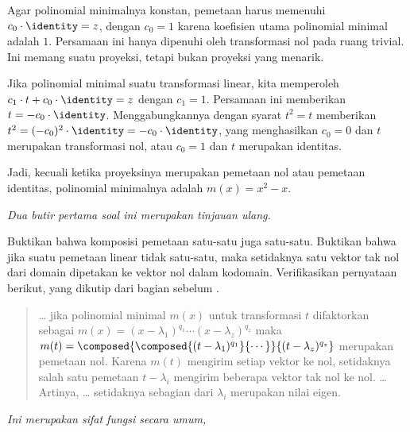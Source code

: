 \begin{exercises}
\begin{answer}
      Agar polinomial minimalnya konstan, pemetaan harus memenuhi
      $c_0\cdot\identity=z$, dengan $c_0=1$ karena koefisien utama
      polinomial minimal adalah $1$.
      Persamaan ini hanya dipenuhi oleh transformasi nol pada ruang trivial.
      Ini memang suatu proyeksi, tetapi bukan proyeksi yang menarik.

      Jika polinomial minimal suatu transformasi linear, kita memperoleh
      $c_1\cdot t+c_0\cdot\identity=z$ dengan $c_1=1$.
      Persamaan ini memberikan $t=-c_0\cdot \identity$.
      Menggabungkannya dengan syarat $t^2=t$ memberikan
      $t^2=(-c_0)^2\cdot\identity=-c_0\cdot\identity$, yang menghasilkan
      $c_0=0$ dan $t$ merupakan transformasi nol, atau $c_0=1$ dan
      $t$ merupakan identitas.

      Jadi, kecuali ketika proyeksinya merupakan pemetaan nol atau
      pemetaan identitas, polinomial minimalnya adalah $m(x)=x^2-x$.
    \end{answer}
  \item \label{exer:SomeRootsMinPolyAreEigs}
    \textit{Dua butir pertama soal ini merupakan tinjauan ulang.}
    \begin{exparts}
      \partsitem Buktikan bahwa komposisi pemetaan satu-satu juga
        satu-satu.
      \partsitem Buktikan bahwa jika suatu pemetaan linear tidak satu-satu,
        maka setidaknya satu vektor tak nol dari domain dipetakan ke
        vektor nol dalam kodomain.
      \partsitem Verifikasikan pernyataan berikut, yang dikutip dari bagian
         sebelum .
         \begin{quotation}
           \noindent \ldots{} 
           jika polinomial minimal $m(x)$ untuk transformasi $t$
           difaktorkan sebagai
           $m(x)=(x-\lambda_1)^{q_1}\cdots (x-\lambda_z)^{q_z}$
           maka
           \( m(t)=\composed{\composed{(t-\lambda_1)^{q_1}}{\cdots}}{
                                                        (t-\lambda_z)^{q_z}} \) 
          merupakan pemetaan nol.
          Karena \( m(t) \) mengirim setiap vektor ke nol, setidaknya
          salah satu pemetaan \( t-\lambda_i \) mengirim beberapa
          vektor tak nol ke nol. \ldots{}
          Artinya, \ldots{}
          setidaknya sebagian dari \( \lambda_i \) merupakan nilai eigen.
        \end{quotation}
    \end{exparts}
    \begin{answer}
      \begin{exparts}
       \partsitem \textit{Ini merupakan sifat fungsi secara umum,
}
\end{exparts}
\end{answer}
\end{exercises}
